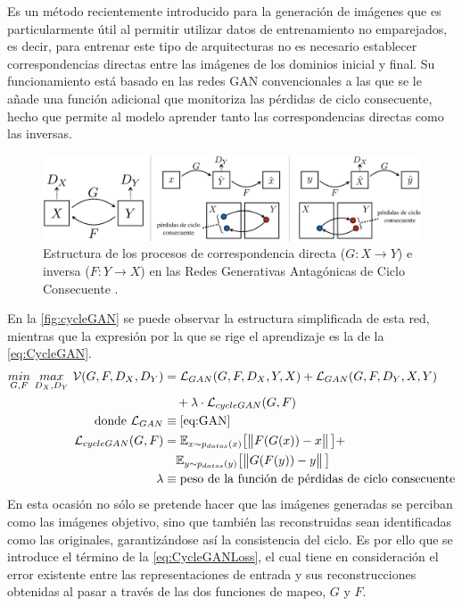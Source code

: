 Es un método recientemente introducido \cite{cycleGAN} para la generación de imágenes que es particularmente útil al permitir utilizar datos de entrenamiento no emparejados, es decir, para entrenar este tipo de arquitecturas no es necesario establecer correspondencias directas entre las imágenes de los dominios inicial y final. Su funcionamiento está basado en las redes GAN convencionales a las que se le añade una función adicional que monitoriza las pérdidas de ciclo consecuente, hecho que permite al modelo aprender tanto las correspondencias directas como las inversas.
\begin{figure}
    \centering
    \includegraphics[width=\textwidth]{Images/cycleGAN.png}
    \caption{Estructura de los procesos de correspondencia directa ($G : X \to Y$) e inversa ($F : Y \to X$) en las Redes Generativas Antagónicas de Ciclo Consecuente \cite{cycleGAN}.}
    \label{fig:cycleGAN}
\end{figure}

En la \autoref{fig:cycleGAN} se puede observar la estructura simplificada de esta red, mientras que la expresión por la que se rige el aprendizaje es la de la \autoref{eq:CycleGAN}.
\begin{align}
    \underset{G,F}{min} \ \underset{D_X, D_Y}{max} \ \mathcal{V}(G, F, D_X, D_Y) &= \mathcal{L}_{GAN}(G, F, D_X, Y, X) + \mathcal{L}_{GAN}(G, F, D_Y, X, Y) \notag \\ &\quad + \lambda \cdot \mathcal{L}_{cycleGAN}(G, F) \label{eq:CycleGAN} \\
    \text{donde}~
    \mathcal{L}_{GAN} &\equiv \text{\autoref{eq:GAN}} \notag \\
    \mathcal{L}_{cycleGAN}(G, F) &= \mathbb{E}_{x\sim p_{datos}(x)} \big[\norm{F(G(x)) - x}\big] + \notag \\ &\quad \mathbb{E}_{y\sim p_{datos}(y)} \big[\norm{G(F(y)) - y}\big] \label{eq:CycleGANLoss}\\
    \lambda &\equiv \text{peso de la función de pérdidas de ciclo consecuente} \notag
\end{align}
En esta ocasión no sólo se pretende hacer que las imágenes generadas se perciban como las imágenes objetivo, sino que también las reconstruidas sean identificadas como las originales, garantizándose así la consistencia del ciclo. Es por ello que se introduce el término de la \autoref{eq:CycleGANLoss}, el cual tiene en consideración el error existente entre las representaciones de entrada y sus reconstrucciones obtenidas al pasar a través de las dos funciones de mapeo, $G$ y $F$.

